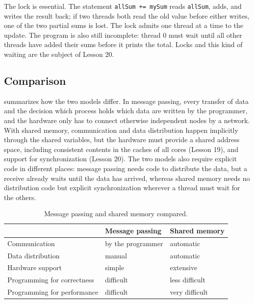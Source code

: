 \documentclass[../main.tex]{subfiles}
\begin{document}
The lock is essential.  The statement \texttt{allSum += mySum} reads
\texttt{allSum}, adds, and writes the result back; if two threads both read
the old value before either writes, one of the two partial sums is lost.
The lock admits one thread at a time to the update.  The program is also
still incomplete: thread 0 must wait until all other threads have added
their sums before it prints the total.  Locks and this kind of waiting are
the subject of Lesson 20.

\subsection{Comparison}

 summarizes how the two models differ.  In message
passing, every transfer of data and the decision which process holds which
data are written by the programmer, and the hardware only has to connect
otherwise independent nodes by a network.  With shared memory,
communication and data distribution happen implicitly through the shared
variables, but the hardware must provide a shared address space, including
consistent contents in the caches of all cores (Lesson 19), and support for
synchronization (Lesson 20).  The two models also require explicit code in
different places: message passing needs code to distribute the data, but a
receive already waits until the data has arrived, whereas shared memory
needs no distribution code but explicit synchronization wherever a thread
must wait for the others.

\begin{table}[htbp]
  \centering\small
  \caption{Message passing and shared memory compared.}
  \label{tab:l18-mp-sm}
  \begin{tabular}{@{}lll@{}}
    \toprule
                                   & Message passing   & Shared memory \\
    \midrule
    Communication                  & by the programmer & automatic \\
    Data distribution              & manual            & automatic \\
    Hardware support               & simple            & extensive \\
    Programming for correctness    & difficult         & less difficult \\
    Programming for performance    & difficult         & very difficult \\
    \bottomrule
  \end{tabular}
\end{table}
\end{document}
